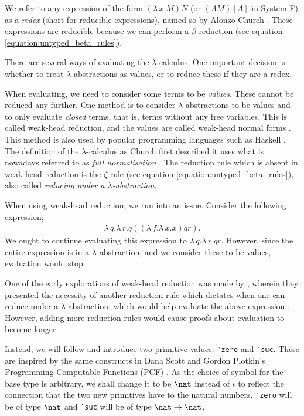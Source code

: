 We refer to any expression of the form $(\lambda \, x. M) N$ (or $(\Lambda M) [A]$ in System F) as a
\textit{redex} (short for reducible expressions), named so by Alonzo Church
\citep[p.~56]{pierce_types_2002}. These expressions are reducible because we can perform a
$\beta$-reduction (see equation \ref{equation:untyped_beta_rules}).

There are several ways of evaluating the $\lambda$-calculus. One important decision is whether to
treat $\lambda$-abstractions as values, or to reduce these if they are a redex.

When evaluating, we need to consider some terms to be \textit{values}. These cannot be reduced any
further. One method is to consider $\lambda$-abstractions to be values and to only evaluate
\textit{closed} terms, that is, terms without any free variables. This is called weak-head
reduction, and the values are called weak-head normal forms \citep{wadler_programming_2022}. This
method is also used by popular programming languages such as Haskell \citep{hutchison_sharing_2005}.
The definition of the $\lambda$-calculus as Church first described it uses what is nowadays referred
to as \textit{full normalisation} \citep{wadler_programming_2022}. The reduction rule which is
absent in weak-head reduction is the $\zeta$ rule (see equation \ref{equation:untyped_beta_rules}),
also called \textit{reducing under a $\lambda$-abstraction}.

When using weak-head reduction, we run into an issue. Consider the following expression;
\begin{align*}
  \lambda \, q. \lambda \, r. q ((\lambda \, f. \lambda \, x . x) q r).
\end{align*}
We ought to continue evaluating this expression to $\lambda \, q. \lambda \, r. q r$. However, since
the entire expression is in a $\lambda$-abstraction, and we consider these to be values, evaluation
would stop.

One of the early explorations of weak-head reduction was made by \citet{cagman_combinatory_1998},
wherein they presented the necessity of another reduction rule which dictates when one can reduce
under a $\lambda$-abstraction, which would help evaluate the above expression
\citep{hutchison_sharing_2005}. However, adding more reduction rules would cause proofs about
evaluation to become longer.

Instead, we will follow \citet{wadler_programming_2022} and introduce two primitive values:
\texttt{‵zero} and \texttt{‵suc}. These are inspired by the same constructs in Dana Scott and Gordon
Plotkin's Programming Computable Functions (PCF) \citep{plotkin_lcf_1977}. As the choice of symbol
for the base type is arbitrary, we shall change it to be $\nat$ instead of $\iota$ to reflect the
connection that the two new primitives have to the natural numbers. \texttt{‵zero} will be of type
$\nat$ and \texttt{‵suc} will be of type $\nat \to \nat$.

